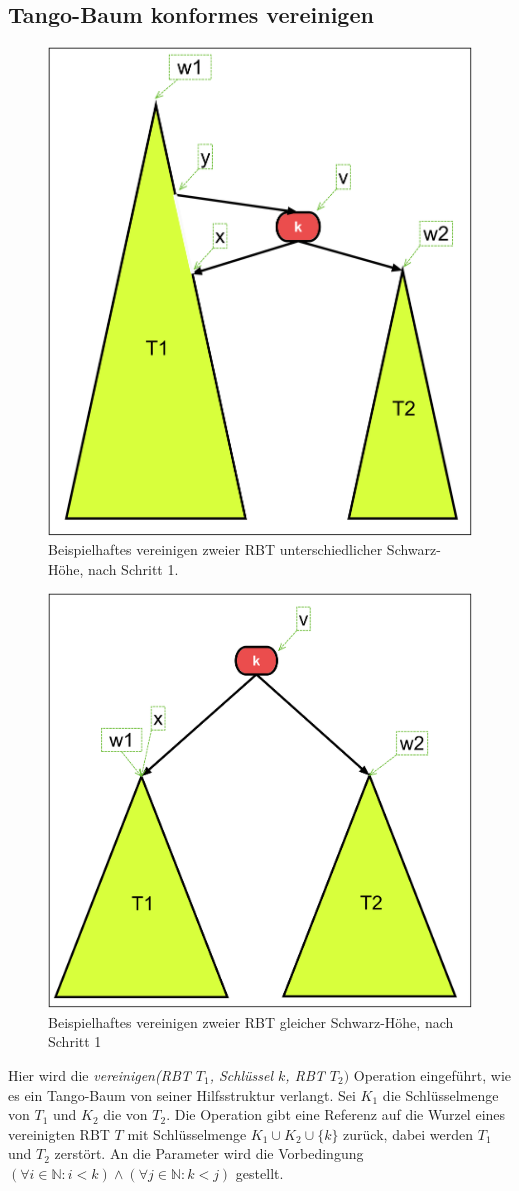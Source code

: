 \documentclass[a4paper,12pt]{article}
\begin{document}
\subsection{Tango-Baum konformes vereinigen} \label{vereinigen}
\begin{figure}[h]
	\centering
	\includegraphics[height= 0.6\textwidth]{"Medien/RotSchwarzBaum/vereinigen"}
	\caption{Beispielhaftes vereinigen zweier RBT unterschiedlicher Schwarz-Höhe, nach Schritt 1. }
	\label{fig:vereinigen}
\end{figure}
\begin{figure}[h]
	\centering
	\includegraphics[height= 0.6\textwidth]{"Medien/RotSchwarzBaum/vereinigen2"}
	\caption{Beispielhaftes vereinigen zweier RBT gleicher Schwarz-Höhe, nach Schritt 1 }
	\label{fig:vereinigen2}
\end{figure}
\noindent Hier wird die \textit{vereinigen(RBT $T_1$, Schlüssel $k$, RBT $T_2)$} Operation eingeführt, wie es ein Tango-Baum von seiner Hilfsstruktur verlangt. Sei $K_1$ die Schlüsselmenge von $T_1$ und $K_2$ die von $T_2$. Die Operation gibt eine Referenz auf die Wurzel eines vereinigten RBT $T$ mit Schlüsselmenge $K_1 \cup K_2 \cup \{k\} $ zurück, dabei werden $T_1$ und $T_2$ zerstört. An die Parameter wird die Vorbedingung $(\forall i \in \mathbb{N}: i < k ) \land (\forall j \in \mathbb{N}: k < j )$ gestellt.\\
\end{document}
